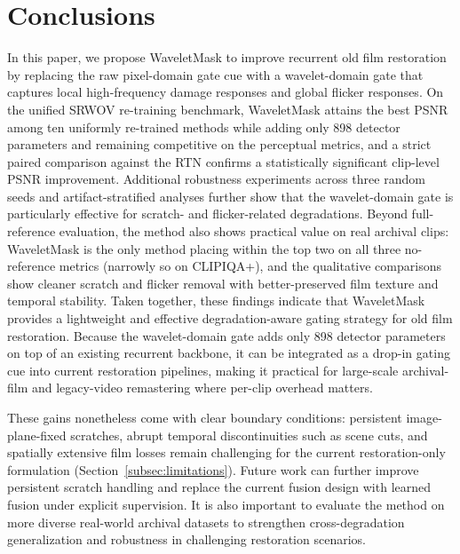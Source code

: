 \section{Conclusions}\label{sec:conclusions}

In this paper, we propose WaveletMask to improve recurrent old film restoration by replacing the raw pixel-domain gate cue with a wavelet-domain gate that captures local high-frequency damage responses and global flicker responses. On the unified SRWOV re-training benchmark, WaveletMask attains the best PSNR among ten uniformly re-trained methods while adding only 898 detector parameters and remaining competitive on the perceptual metrics, and a strict paired comparison against the RTN confirms a statistically significant clip-level PSNR improvement. Additional robustness experiments across three random seeds and artifact-stratified analyses further show that the wavelet-domain gate is particularly effective for scratch- and flicker-related degradations. Beyond full-reference evaluation, the method also shows practical value on real archival clips: WaveletMask is the only method placing within the top two on all three no-reference metrics (narrowly so on CLIPIQA+), and the qualitative comparisons show cleaner scratch and flicker removal with better-preserved film texture and temporal stability. Taken together, these findings indicate that WaveletMask provides a lightweight and effective degradation-aware gating strategy for old film restoration. Because the wavelet-domain gate adds only 898 detector parameters on top of an existing recurrent backbone, it can be integrated as a drop-in gating cue into current restoration pipelines, making it practical for large-scale archival-film and legacy-video remastering where per-clip overhead matters.

These gains nonetheless come with clear boundary conditions: persistent image-plane-fixed scratches, abrupt temporal discontinuities such as scene cuts, and spatially extensive film losses remain challenging for the current restoration-only formulation (Section~\ref{subsec:limitations}). Future work can further improve persistent scratch handling and replace the current fusion design with learned fusion under explicit supervision. It is also important to evaluate the method on more diverse real-world archival datasets to strengthen cross-degradation generalization and robustness in challenging restoration scenarios.
